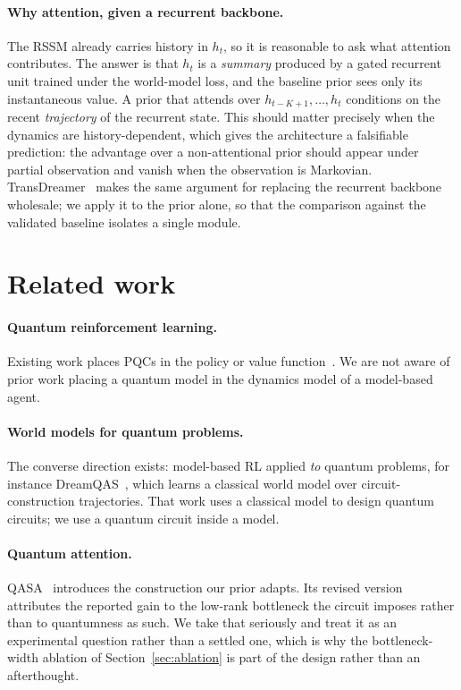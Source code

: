 \documentclass[11pt,onecolumn]{article}
\newif\ifdraft
\newcommand{\pend}[1]{%
  \ifdraft\textcolor{PendFG}{\textbf{[}\textit{#1}\textbf{]}}\fi}
\begin{document}
\paragraph{Why attention, given a recurrent backbone.}\label{sec:background-attention}
The RSSM already carries history in $h_t$, so it is reasonable to ask
what attention contributes. The answer is that $h_t$ is a \emph{summary}
produced by a gated recurrent unit trained under the world-model loss,
and the baseline prior sees only its instantaneous value. A prior that
attends over $h_{t-K+1}, \dots, h_t$ conditions on the recent
\emph{trajectory} of the recurrent state. This should matter precisely
when the dynamics are history-dependent, which gives the architecture a
falsifiable prediction: the advantage over a non-attentional prior
should appear under partial observation and vanish when the observation
is Markovian. TransDreamer~\cite{transdreamer} makes the same argument
for replacing the recurrent backbone wholesale; we apply it to the prior
alone, so that the comparison against the validated baseline isolates a
single module.

\section{Related work}
\paragraph{Quantum reinforcement learning.}
Existing work places PQCs in the policy or value
function~\cite{chen2020,skolik2023}. We are not aware of prior work
placing a quantum model in the dynamics model of a model-based agent.
\pend{Appendix~\ref{app:novelty}: databases, search strings, dates}

\paragraph{World models for quantum problems.}
The converse direction exists: model-based RL applied \emph{to} quantum
problems, for instance DreamQAS~\cite{dreamqas}, which learns a
classical world model over circuit-construction trajectories. That work
uses a classical model to design quantum circuits; we use a quantum
circuit inside a model.

\paragraph{Quantum attention.}
QASA~\cite{qasa} introduces the construction our prior adapts. Its
revised version attributes the reported gain to the low-rank bottleneck
the circuit imposes rather than to quantumness as such. We take that
seriously and treat it as an experimental question rather than a
settled one, which is why the bottleneck-width ablation of
Section~\ref{sec:ablation} is part of the design rather than an
afterthought.
\end{document}
